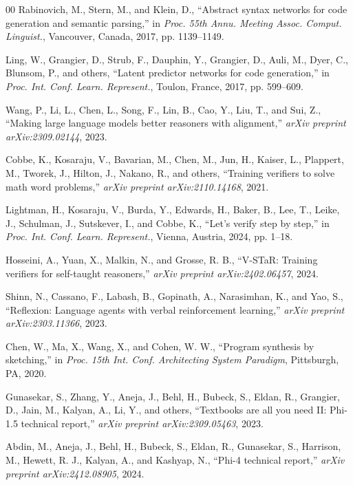 \documentclass[conference]{IEEEtran}
\begin{document}
\begin{thebibliography}{00}
 Rabinovich, M., Stern, M., and Klein, D., ``Abstract syntax networks for code generation and semantic parsing,'' in \textit{Proc. 55th Annu. Meeting Assoc. Comput. Linguist.}, Vancouver, Canada, 2017, pp. 1139--1149.

 Ling, W., Grangier, D., Strub, F., Dauphin, Y., Grangier, D., Auli, M., Dyer, C., Blunsom, P., and others, ``Latent predictor networks for code generation,'' in \textit{Proc. Int. Conf. Learn. Represent.}, Toulon, France, 2017, pp. 599--609.

 Wang, P., Li, L., Chen, L., Song, F., Lin, B., Cao, Y., Liu, T., and Sui, Z., ``Making large language models better reasoners with alignment,'' \textit{arXiv preprint arXiv:2309.02144}, 2023.

 Cobbe, K., Kosaraju, V., Bavarian, M., Chen, M., Jun, H., Kaiser, L., Plappert, M., Tworek, J., Hilton, J., Nakano, R., and others, ``Training verifiers to solve math word problems,'' \textit{arXiv preprint arXiv:2110.14168}, 2021.

 Lightman, H., Kosaraju, V., Burda, Y., Edwards, H., Baker, B., Lee, T., Leike, J., Schulman, J., Sutskever, I., and Cobbe, K., ``Let's verify step by step,'' in \textit{Proc. Int. Conf. Learn. Represent.}, Vienna, Austria, 2024, pp. 1--18.

 Hosseini, A., Yuan, X., Malkin, N., and Grosse, R. B., ``V-STaR: Training verifiers for self-taught reasoners,'' \textit{arXiv preprint arXiv:2402.06457}, 2024.

 Shinn, N., Cassano, F., Labash, B., Gopinath, A., Narasimhan, K., and Yao, S., ``Reflexion: Language agents with verbal reinforcement learning,'' \textit{arXiv preprint arXiv:2303.11366}, 2023.

 Chen, W., Ma, X., Wang, X., and Cohen, W. W., ``Program synthesis by sketching,'' in \textit{Proc. 15th Int. Conf. Architecting System Paradigm}, Pittsburgh, PA, 2020.

 Gunasekar, S., Zhang, Y., Aneja, J., Behl, H., Bubeck, S., Eldan, R., Grangier, D., Jain, M., Kalyan, A., Li, Y., and others, ``Textbooks are all you need II: Phi-1.5 technical report,'' \textit{arXiv preprint arXiv:2309.05463}, 2023.

 Abdin, M., Aneja, J., Behl, H., Bubeck, S., Eldan, R., Gunasekar, S., Harrison, M., Hewett, R. J., Kalyan, A., and Kashyap, N., ``Phi-4 technical report,'' \textit{arXiv preprint arXiv:2412.08905}, 2024.


\end{thebibliography}
\end{document}
